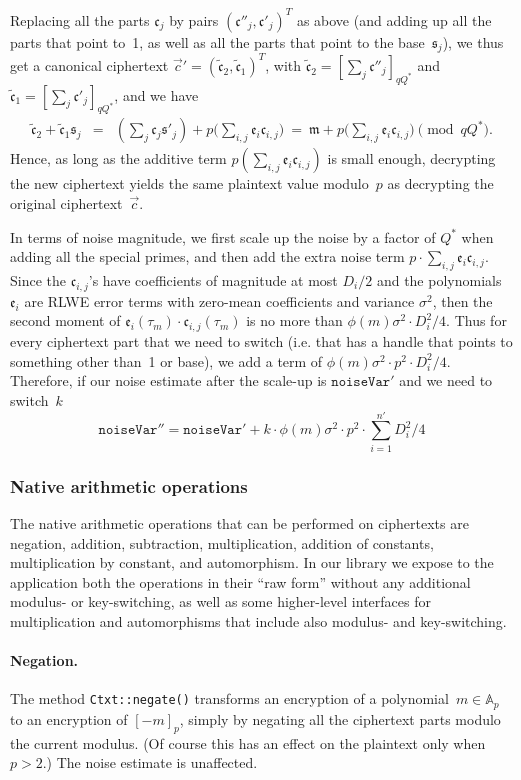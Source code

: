 \documentclass[14pt]{extarticle}
\newcommand{\A}{\mathbb{A}}
\def\vc{\vec{c}}
\newcommand{\ee}{\mathfrak{e}}
\newcommand{\ct}{\mathfrak{c}}
\newcommand{\mm}{\mathfrak{m}}
\newcommand{\sk}{\mathfrak{s}}
\begin{document}
Replacing all the parts $\ct_j$ by pairs $(\ct''_j,\ct'_j)^T$ as
above (and adding up all the parts that point to~1, as well as all
the parts that point to the base~$\sk_j$), we thus get a canonical
ciphertext $\vc'=(\tilde{\ct}_2,\tilde{\ct}_1)^T$, with 
$\tilde{\ct}_2=[\sum_j \ct''_j]_{qQ^*}$ and $\tilde{\ct}_1=[\sum_j
\ct'_j]_{qQ^*}$, and we have
\begin{eqnarray*}
\tilde{\ct}_2+\tilde{\ct}_1\sk_j 
&=& \left(\sum_j\ct_j \sk'_j\right) + p\big(\sum_{i,j} \ee_i\ct_{i,j}\big)
~=~ \mm + p\big(\sum_{i,j} \ee_i\ct_{i,j}\big) \pmod{qQ^*}.
\end{eqnarray*}
Hence, as long as the additive term $p(\sum_{i,j} \ee_i\ct_{i,j})$ is
small enough, decrypting the new ciphertext yields the same plaintext
value modulo~$p$ as decrypting the original ciphertext~$\vc$.

In terms of noise magnitude, we first scale up the noise by a factor
of $Q^*$ when adding all the special primes, and then add the extra
noise term $p\cdot\sum_{i,j} \ee_i\ct_{i,j}$. Since the $\ct_{i,j}$'s
have coefficients of magnitude at most $D_i/2$ and the polynomials
$\ee_i$ are RLWE error terms with zero-mean coefficients and variance
$\sigma^2$, then the second moment of $\ee_i(\tau_m)
\cdot\ct_{i,j}(\tau_m)$ is no more than $\phi(m)\sigma^2\cdot D_i^2/4$.
Thus for every ciphertext part that we need to switch (i.e. that has a
handle that points to something other than~1 or base), we add a term
of $\phi(m)\sigma^2\cdot p^2\cdot D_i^2/4$. Therefore, if our noise
estimate after the scale-up is $\mathtt{noiseVar}'$ and we need to
switch~$k$ 
\[
\mathtt{noiseVar}'' = \mathtt{noiseVar}' + k\cdot\phi(m)\sigma^2
\cdot p^2\cdot \sum_{i=1}^{n'} D_i^2/4
\]

\subsubsection{Native arithmetic operations} \label{sec:nativeArith}
The native arithmetic operations that can be performed on ciphertexts
are negation, addition, subtraction, multiplication, addition of
constants, multiplication by constant, and automorphism. In our library
we expose to the application both the operations in their ``raw form''
without any additional modulus- or key-switching, as well as some
higher-level interfaces for multiplication and automorphisms that
include also modulus- and key-switching.

\paragraph{Negation.} The method \texttt{Ctxt::negate()} transforms
an encryption of a polynomial~$m\in\A_p$ to an encryption of
$[-m]_p$, simply by negating all the ciphertext parts modulo the
current modulus. (Of course this has an effect on the plaintext only
when $p>2$.) The noise estimate is unaffected.
\end{document}
